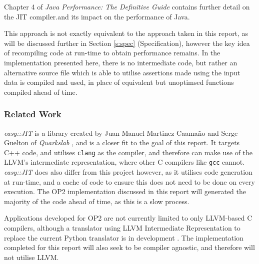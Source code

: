 \noindent Chapter 4 of \textit{Java Performance: The Definitive Guide} \cite{javaPerf} contains further detail on the JIT compiler.and its impact on the performance of Java.

This approach is not exactly equivalent to the approach taken in this report, as will be discussed further in Section \ref{s:spec} (Specification), however the key idea of recompiling code at run-time to obtain performance remains. In the implementation presented here, there is no intermediate code, but rather an alternative source file which is able to utilise assertions made using the input data is compiled and used, in place of equivalent but unoptimsed functions compiled ahead of time.

\subsubsection{Related Work}

\hspace{\parindent} \textit{easy::JIT} \cite{eJIT} is a library created by Juan Manuel Martinez Caamaño and Serge Guelton of \textit{Quarkslab} \cite{Quarkslab}, and is a closer fit to the goal of this report. It targets C++ code, and utilises \verb|clang| \cite{clang} as the compiler, and therefore can make use of the LLVM's intermediate representation, where other C compilers like \verb|gcc| cannot. \textit{easy::JIT} does also differ from this project however, as it utilises code generation at run-time, and a cache of code to ensure this does not need to be done on every execution. The OP2 implementation discussed in this report will generated the majority of the code ahead of time, as this is a slow process.
\par
Applications developed for OP2 are not currently limited to only LLVM-based C compilers, although a translator using LLVM Intermediate Representation to replace the current Python translator is in development \cite{op2clang}. The implementation completed for this report will also seek to be compiler agnostic, and therefore will not utilise LLVM.
